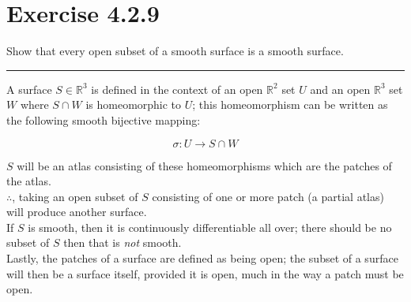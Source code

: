 \documentclass[12pt]{article}
\newcommand{\R}
{
\mathbb{R}
}
\begin{document}
\maketitle

\section*{Exercise 4.2.9}
\indent

Show that every open subset of a smooth surface is a smooth surface.

\vspace{1cm}
\hrule
\vspace{1cm}
\noindent

A surface $S \in \R^3$ is defined in the context of an open $\R^2$ set $U$ and an open $\R^3$ set $W$ where $S \cap W$ is homeomorphic to $U$; this homeomorphism can be written as the following smooth bijective mapping:

$$
\sigma:U \rightarrow S \cap W
$$

$S$ will be an atlas consisting of these homeomorphisms which are the patches of the atlas.\\
\indent
$\therefore$, taking an open subset of $S$ consisting of one or more patch (a partial atlas) will produce another surface.\\

\indent
If $S$ is smooth, then it is continuously differentiable all over; there should be no subset of $S$ then that is \emph{not} smooth.\\
\indent
Lastly, the patches of a surface are defined as being open; the subset of a surface will then be a surface itself, provided it is open, much in the way a patch must be open.
\end{document}
